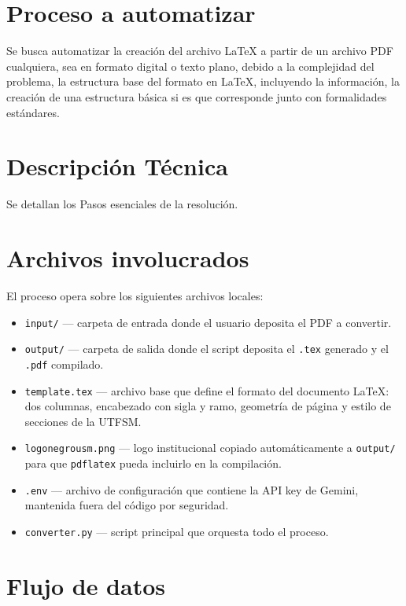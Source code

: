 \documentclass[twocolumn, 11pt, letterpaper]{article}
\begin{document}
\section*{Proceso a automatizar}

Se busca automatizar la creación del archivo LaTeX a partir de un archivo PDF cualquiera, sea en formato digital o texto plano, debido a la complejidad del problema, la estructura base del formato en LaTeX, incluyendo la información, la creación de una estructura básica si es que corresponde junto con formalidades estándares.


\section*{Descripción Técnica}

Se detallan los Pasos esenciales de la resolución.

\section*{Archivos involucrados}

El proceso opera sobre los siguientes archivos locales:

\begin{itemize}
    \item \texttt{input/} --- carpeta de entrada donde el usuario deposita el PDF a convertir.
    \item \texttt{output/} --- carpeta de salida donde el script deposita el \texttt{.tex} generado y el \texttt{.pdf} compilado.
    \item \texttt{template.tex} --- archivo base que define el formato del documento LaTeX: dos columnas, encabezado con sigla y ramo, geometría de página y estilo de secciones de la UTFSM.
    \item \texttt{logonegrousm.png} --- logo institucional copiado automáticamente a \texttt{output/} para que \texttt{pdflatex} pueda incluirlo en la compilación.
    \item \texttt{.env} --- archivo de configuración que contiene la API key de Gemini, mantenida fuera del código por seguridad.
    \item \texttt{converter.py} --- script principal que orquesta todo el proceso.
\end{itemize}

\section*{Flujo de datos}
\end{document}
